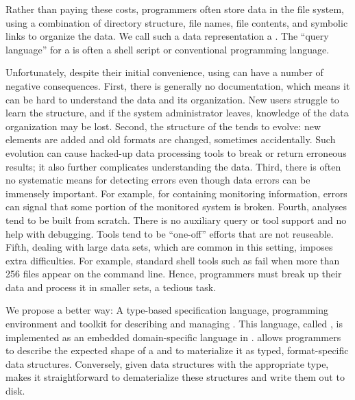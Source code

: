 Rather than paying these costs, programmers often store data in
the file system, using a combination of directory structure, file
names, file contents, and symbolic links to organize the data.  We call such a
data representation a \textit{\filestore{}}.
The ``query language'' for a \filestore{}
is often a shell script or conventional programming language.

Unfortunately, despite their initial convenience,
using \filestores{} can have a number of 
negative consequences.  First, there is generally no documentation,
which means it can be hard to understand the data and its
organization.  New users struggle to learn the structure, and if
the system administrator leaves, knowledge of the data
organization may be lost.  Second, the structure of the \filestore{} tends
to evolve: new elements are added and old formats are changed, sometimes
accidentally.  Such evolution can cause hacked-up data processing
tools to break or return erroneous results; it also further complicates
understanding the data.  Third, there is often no
systematic means for detecting errors even though data errors can
be immensely
important.  For example, for \filestores{} containing monitoring information,
errors can signal that some portion of the monitored system is broken.
Fourth, analyses tend to be built from scratch.
There is no auxiliary query or tool support and no help with debugging.
Tools tend to be ``one-off'' efforts that are not
reuseable.  Fifth, dealing with
large data sets, which are common in this setting, imposes extra
difficulties.  For example,  standard shell tools
such as  fail when more than 256 files appear on the
command line.  Hence, programmers must  break up their data
and process it in smaller sets, a tedious task.

We propose a better way: A type-based
specification language, programming environment and toolkit for
describing and managing \filestores{}.  
This language, called \forest{}, is implemented as an embedded domain-specific
language in \haskell{}.
\forest{} allows programmers to describe the expected shape of a
\filestore{} and to materialize it as typed,
format-specific \haskell{} data structures.  Conversely,
given data structures with the appropriate type, \forest{}
makes it straightforward to dematerialize these structures
and write them out to disk.  

